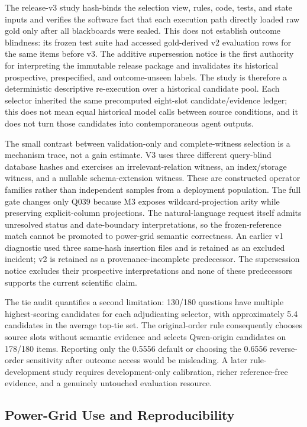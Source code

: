 \documentclass[applsci,article,submit,moreauthors]{Definitions/mdpi}
\begin{document}
The release-v3 study hash-binds the selection view, rules, code, tests, and state inputs and verifies the software fact that each execution path directly loaded raw gold only after all blackboards were sealed. This does not establish outcome blindness: its frozen test suite had accessed gold-derived v2 evaluation rows for the same items before v3. The additive supersession notice is the first authority for interpreting the immutable release package and invalidates its historical prospective, prespecified, and outcome-unseen labels. The study is therefore a deterministic descriptive re-execution over a historical candidate pool. Each selector inherited the same precomputed eight-slot candidate/evidence ledger; this does not mean equal historical model calls between source conditions, and it does not turn those candidates into contemporaneous agent outputs.

The small contrast between validation-only and complete-witness selection is a mechanism trace, not a gain estimate. V3 uses three different query-blind database hashes and exercises an irrelevant-relation witness, an index/storage witness, and a nullable schema-extension witness. These are constructed operator families rather than independent samples from a deployment population. The full gate changes only Q039 because M3 exposes wildcard-projection arity while preserving explicit-column projections. The natural-language request itself admits unresolved status and date-boundary interpretations, so the frozen-reference match cannot be promoted to power-grid semantic correctness. An earlier v1 diagnostic used three same-hash insertion files and is retained as an excluded incident; v2 is retained as a provenance-incomplete predecessor. The supersession notice excludes their prospective interpretations and none of these predecessors supports the current scientific claim.

The tie audit quantifies a second limitation: 130/180 questions have multiple highest-scoring candidates for each adjudicating selector, with approximately 5.4 candidates in the average top-tie set. The original-order rule consequently chooses source slots without semantic evidence and selects Qwen-origin candidates on 178/180 items. Reporting only the 0.5556 default or choosing the 0.6556 reverse-order sensitivity after outcome access would be misleading. A later rule-development study requires development-only calibration, richer reference-free evidence, and a genuinely untouched evaluation resource.

\subsection{Power-Grid Use and Reproducibility}
\end{document}
